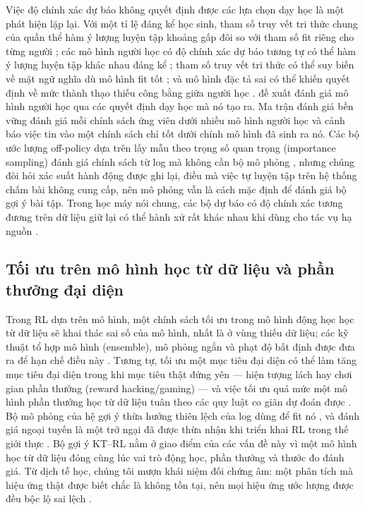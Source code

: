 \documentclass[a4paper,preprint,12pt,authoryear]{elsarticle}
\begin{document}
Việc độ chính xác dự báo không quyết định được các lựa chọn dạy học là một phát hiện lặp lại. Với một tỉ lệ đáng kể học sinh, tham số truy vết tri thức chung của quần thể hàm ý lượng luyện tập khoảng gấp đôi so với tham số fit riêng cho từng người \citep{lee2012individualizing}; các mô hình người học có độ chính xác dự báo tương tự có thể hàm ý lượng luyện tập khác nhau đáng kể \citep{rollinson2015predictive}; tham số truy vết tri thức có thể suy biến về mặt ngữ nghĩa dù mô hình fit tốt \citep{doroudi2017identifiability}; và mô hình đặc tả sai có thể khiến quyết định về mức thành thạo thiếu công bằng giữa người học \citep{doroudi2019fairer}. \citet{gonzalezbrenes2015leopard} đề xuất đánh giá mô hình người học qua các quyết định dạy học mà nó tạo ra. Ma trận đánh giá bền vững \citep{doroudi2017rem} đánh giá mỗi chính sách ứng viên dưới nhiều mô hình người học và cảnh báo việc tin vào một chính sách chỉ tốt dưới chính mô hình đã sinh ra nó. Các bộ ước lượng off-policy dựa trên lấy mẫu theo trọng số quan trọng (importance sampling) đánh giá chính sách từ log mà không cần bộ mô phỏng \citep{mandel2014offline,thomas2016dataefficient}, nhưng chúng đòi hỏi xác suất hành động được ghi lại, điều mà việc tự luyện tập trên hệ thống chấm bài không cung cấp, nên mô phỏng vẫn là cách mặc định để đánh giá bộ gợi ý bài tập. Trong học máy nói chung, các bộ dự báo có độ chính xác tương đương trên dữ liệu giữ lại có thể hành xử rất khác nhau khi dùng cho tác vụ hạ nguồn \citep{breiman2001two,damour2022underspecification}.

\subsection{Tối ưu trên mô hình học từ dữ liệu và phần thưởng đại diện}

Trong RL dựa trên mô hình, một chính sách tối ưu trong mô hình động học học từ dữ liệu sẽ khai thác sai số của mô hình, nhất là ở vùng thiếu dữ liệu; các kỹ thuật tổ hợp mô hình (ensemble), mô phỏng ngắn và phạt độ bất định được đưa ra để hạn chế điều này \citep{kurutach2018metrpo,janner2019trust,yu2020mopo,moerland2023mbrl,levine2020offline}. Tương tự, tối ưu một mục tiêu đại diện có thể làm tăng mục tiêu đại diện trong khi mục tiêu thật đứng yên — hiện tượng lách hay chơi gian phần thưởng (reward hacking/gaming) \citep{amodei2016concrete,skalse2022reward} — và việc tối ưu quá mức một mô hình phần thưởng học từ dữ liệu tuân theo các quy luật co giãn dự đoán được \citep{gao2023scaling}. Bộ mô phỏng của hệ gợi ý thừa hưởng thiên lệch của log dùng để fit nó \citep{huang2020keeping}, và đánh giá ngoại tuyến là một trở ngại đã được thừa nhận khi triển khai RL trong thế giới thực \citep{dulacarnold2021challenges}. Bộ gợi ý KT--RL nằm ở giao điểm của các vấn đề này vì một mô hình học từ dữ liệu đóng cùng lúc vai trò động học, phần thưởng và thước đo đánh giá. Từ dịch tễ học, chúng tôi mượn khái niệm đối chứng âm: một phân tích mà hiệu ứng thật được biết chắc là không tồn tại, nên mọi hiệu ứng ước lượng được đều bộc lộ sai lệch \citep{lipsitch2010negative,arnold2016negative}.
\end{document}
